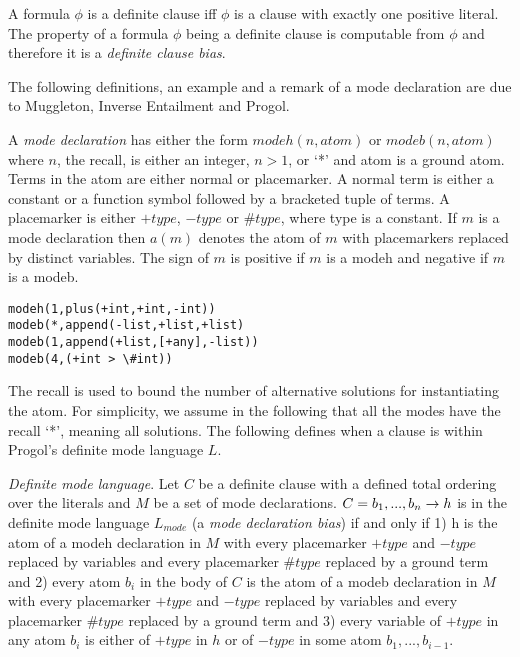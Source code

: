 \begin{defn}
A formula $\phi$ is a definite clause iff $\phi$ is a clause with exactly one positive literal. The property of a formula $\phi$ being a definite clause is computable from $\phi$ and therefore it is a \emph{definite clause bias}.
\end{defn}

The following definitions, an example and a remark of a mode declaration are due to Muggleton, Inverse Entailment and Progol\cite{muggleton1995inverse}.
\begin{defn}\cite{muggleton1995inverse}
A \emph{mode declaration} has either the form
$modeh(n,atom)$ or $modeb(n,atom)$ where $n$, the recall, is either an integer, $n > 1$,
or `*' and atom is a ground atom. Terms in the atom are either normal or placemarker. A normal term is either a constant or a function symbol followed by a
bracketed tuple of terms. A placemarker is either $+type$, $-type$ or $\#type$, where
type is a constant. If $m$ is a mode declaration then $a(m)$ denotes the atom of $m$
with placemarkers replaced by distinct variables. The sign of $m$ is positive if $m$ is a modeh and negative if $m$ is a modeb.
\end{defn}

\begin{exmp}
\cite{muggleton1995inverse}
\begin{lstlisting}
modeh(1,plus(+int,+int,-int))
modeb(*,append(-list,+list,+list)
modeb(1,append(+list,[+any],-list))
modeb(4,(+int > \#int))
\end{lstlisting}
\end{exmp}

\begin{remark}
\cite{muggleton1995inverse}
The recall is used to bound the number of alternative solutions for instantiating
the atom. For simplicity, we assume in the following that all the modes have the
recall `*', meaning all solutions. The following defines when a clause is within
Progol's definite mode language $L$.
\end{remark}

\begin{defn}
\cite{muggleton1995inverse}
\emph{Definite mode language}. Let $C$ be a definite clause with a
defined total ordering over the literals and $M$ be a set of mode declarations. $C = b_1, ..., b_n \to h$ is in the definite mode language $L_{mode}$ (a \emph{mode declaration bias}) if and only if
1) h is the atom
of a modeh declaration in $M$ with every placemarker $+type$ and $-type$ replaced by
variables and every placemarker $\#type$ replaced by a ground term and 2) every
atom $b_i$ in the body of $C$ is the atom of a modeb declaration in $M$ with every
placemarker $+type$ and $-type$ replaced by variables and every placemarker $\#type$
replaced by a ground term and 3) every variable of $+type$ in any atom $b_i$ is either
of $+type$ in $h$ or of $-type$ in some atom $b_1, ..., b_{i-1}$.
\end{defn}


